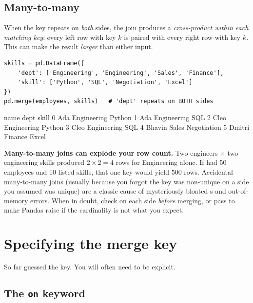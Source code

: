 \documentclass[11pt]{article}
\begin{document}
\subsection{Many-to-many}

When the key repeats on \emph{both} sides, the join produces a \emph{cross-product within each matching key}: every left row with key $k$ is paired with every right row with key $k$. This can make the result \emph{larger} than either input.

\begin{lstlisting}
skills = pd.DataFrame({
    'dept': ['Engineering', 'Engineering', 'Sales', 'Finance'],
    'skill': ['Python', 'SQL', 'Negotiation', 'Excel']
})
pd.merge(employees, skills)   # 'dept' repeats on BOTH sides
\end{lstlisting}

\begin{outblock}
     name         dept        skill
0     Ada  Engineering       Python
1     Ada  Engineering          SQL
2    Cleo  Engineering       Python
3    Cleo  Engineering          SQL
4  Bhavin        Sales  Negotiation
5  Dmitri      Finance        Excel
\end{outblock}

\begin{pitfall}
\textbf{Many-to-many joins can explode your row count.} Two engineers $\times$ two engineering skills produced $2\times2=4$ rows for Engineering alone. If  had 50 employees and 10 listed skills, that one key would yield $500$ rows. Accidental many-to-many joins (usually because you forgot the key was non-unique on a side you assumed was unique) are a classic cause of mysteriously bloated s and out-of-memory errors. When in doubt, check  on each side \emph{before} merging, or pass  to make Pandas raise if the cardinality is not what you expect.
\end{pitfall}

\section{Specifying the merge key}

So far  guessed the key. You will often need to be explicit.

\subsection{The \texttt{on} keyword}
\end{document}
